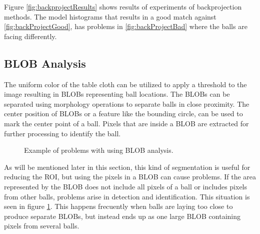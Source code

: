 Figure \ref{fig:backprojectResults} shows results of experiments of backprojection methods. The model histograms that results in a good match against \ref{fig:backProjectGood}, has problems in \ref{fig:backProjectBad} where the balls are facing differently.

\subsection{BLOB Analysis}
The uniform color of the table cloth can be utilized to apply a threshold to the image resulting in BLOBs representing ball locations. The BLOBs can be separated using morphology operations to separate balls in close proximity. The center position of BLOBs or a feature like the bounding circle, can be used to mark the center point of a ball. Pixels that are inside a BLOB are extracted for further processing to identify the ball.
\begin{figure}[htpb]
  \centering
  \quad           
   \caption{Example of problems with using BLOB analysis.}
  \label{fig:blobAnal}
\end{figure}
As will be mentioned later in this section, this kind of segmentation is useful for reducing the ROI, but using the pixels in a BLOB can cause problems. If the area represented by the BLOB does not include all pixels of a ball or includes pixels from other balls, problems arise in detection and identification. This situation is seen in figure \ref{fig:blobAnal}. This happens frecuently when balls are laying too close to produce separate BLOBs, but instead ends up as one large BLOB containing pixels from several balls.

